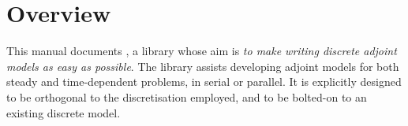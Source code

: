\chapter*{Overview}

This manual documents \libadjoint, a library whose aim is \emph{to make
writing discrete adjoint models as easy as possible}. The library assists
developing adjoint models for both steady and time-dependent problems,
in serial or parallel. It is explicitly designed to be orthogonal to the
discretisation employed, and to be bolted-on to an existing discrete model.
